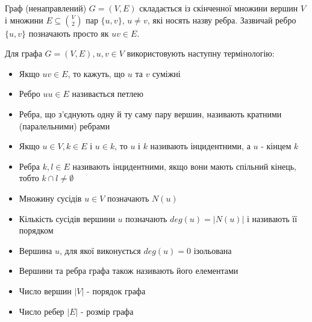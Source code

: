 Граф (ненаправлений) $G = (V,E)$ складається із скінченної множини вершин $V$ і множини $E \subseteq {V \choose 2}$ пар $\{u,v\}$, $u \neq v$, які носять назву ребра.
Зазвичай ребро $\lbrace u,v \rbrace$ позначають просто як $uv \in E$.

Для графа $G = (V,E), u,v \in V$ використовують наступну термінологію:
\begin{itemize}
        \item Якщо $uv \in E$, то кажуть, що $u$ та $v$ суміжні
        \item Ребро $uu \in E$ називається петлею
        \item Ребра, що з'єднують одну й ту саму пару вершин, називають кратними (паралельними) ребрами
        \item Якщо $u \in V, k \in E$ і $u \in k$, то $u$ і $k$ називають інцидентними, а $u$ - кінцем $k$
        \item Ребра $k,l \in E$ називають інцидентними, якщо вони мають спільний кінець, тобто $k \cap l \ne \emptyset$
        \item Множину сусідів $u \in V$ позначають $N(u)$
        \item Кількість сусідів вершини $u$ позначають $deg(u) = \vert N(u) \vert$ і називають її порядком
        \item Вершина $u$, для якої виконується $deg(u) = 0$ ізольована
        \item Вершини та ребра графа також називають його елементами
        \item Число вершин $\vert V \vert$ - порядок графа
        \item Число ребер $\vert E \vert$ - розмір графа
\end{itemize}

